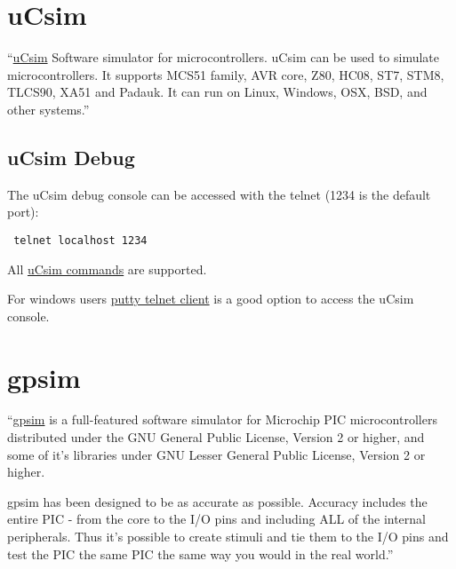  
\section{uCsim}
``\href{http://mazsola.iit.uni-miskolc.hu/\%7edrdani/embedded/ucsim/}{uCsim} Software simulator for microcontrollers. uCsim can be used to simulate microcontrollers. It supports MCS51 family, AVR core, Z80, HC08, ST7, STM8, TLCS90, XA51 and Padauk. It can run on Linux, Windows, OSX, BSD, and other systems.''

\subsection{uCsim Debug} \hypertarget{def:ucsim}{}
  
The uCsim debug console can be accessed with the telnet (1234 is the default port):
 \begin{verbatim}
 telnet localhost 1234
 \end{verbatim}
 
All \href{http://mazsola.iit.uni-miskolc.hu/\%7edrdani/embedded/ucsim/cmd.html}{uCsim commands} are supported.  

For windows users \href{https://www.putty.org/}{putty telnet client} is a good option to access the uCsim console. 
 
  
\section{gpsim}

``\href{http://gpsim.sourceforge.net/}{gpsim} is a full-featured software simulator for Microchip PIC microcontrollers distributed under the GNU General Public License, Version 2 or higher, and some of it's libraries under GNU Lesser General Public License, Version 2 or higher.

gpsim has been designed to be as accurate as possible. Accuracy includes the entire PIC - from the core to the I/O pins and including ALL of the internal peripherals. Thus it's possible to create stimuli and tie them to the I/O pins and test the PIC the same PIC the same way you would in the real world.'' 
  
